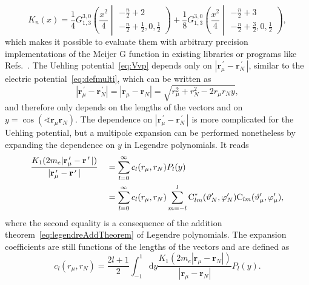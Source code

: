 \begin{equation}
K_n(x)=\frac{1}{4} {G_{1, 3}^{3, 0}\left({\frac{x^{2}}{4}}\middle|\begin{matrix}   - \frac{n}{2} + 2 \\- \frac{n}{2} + \frac{1}{2}, 0, \frac{1}{2}   \end{matrix}   \right)} + \frac{1}{8} {G_{1, 3}^{3, 0}\left(\frac{x^2}{4}\middle| \begin{matrix}   - \frac{n}{2} + 3 \\- \frac{n}{2} + \frac{3}{2}, 0, \frac{1}{2}   \end{matrix}  \right)},
\label{eq:defKnAnalyt}
\end{equation}
which makes it possible to evaluate them with arbitrary precision implementations of the Meijer G function in existing libraries or programs like Refs.~\cite{Mathematica,mpmath}. The Uehling potential~\eqref{eq:Vvp} depends only on $|\mathbf{r}_\mu^{\,\prime} - \mathbf{r}_N^{\,\prime}\,|$, similar to the electric potential~\eqref{eq:defmulti}, which can be written as
\begin{equation}
|\mathbf{r}_\mu^{\,\prime} - \mathbf{r}_N^{\,\prime}|
=|\mathbf{r}_\mu - \mathbf{r}_N|
=\sqrt{r_\mu^2 + r_N^2 - 2 r_\mu r_N y},
\end{equation}
and therefore only depends on the lengths of the vectors and on ${y}{=}{\cos(\sphericalangle \mathbf{r}_\mu\mathbf{r}_N)}$. The dependence on $|\mathbf{r}_\mu^{\,\prime} - \mathbf{r}_N^{\,\prime}\,|$ is more complicated for the Uehling potential, but a multipole expansion can be performed nonetheless by expanding the dependence on $y$ in Legendre polynomials. It reads
\begin{alignat}{2}
&\frac{K_1(2m_e{|\mathbf{r}_\mu^{\,\prime} - \mathbf{r}^{\,\prime}\,|})}{|\mathbf{r}_\mu^{\,\prime} - \mathbf{r}^{\,\prime}\,|}
&&=\sum_{l=0}^\infty c_l(r_\mu,r_N) P_l(y)\\
&&&=\sum_{l=0}^\infty c_l(r_\mu,r_N) \sum_{m=-l}^l \text{C}^*_{lm}(\vartheta_N^{\prime},\varphi_N^{\prime})\text{C}_{lm}(\vartheta_\mu^\prime,\varphi_\mu^\prime),\notag
\end{alignat}
where the second equality is a consequence of the addition theorem~\eqref{eq:legendreAddTheorem} of Legendre polynomials. The expansion coefficients are still functions of the lengths of the vectors and are defined as
\begin{equation}
c_l(r_\mu,r_N)=\frac{2l+1}{2} \int_{-1}^1 \text{d}y \frac{K_1(2m_e{|\mathbf{r}_\mu - \mathbf{r}_N|})}{|\mathbf{r}_\mu - \mathbf{r}_N|} P_l(y).
\label{eq:defcl}
\end{equation}
